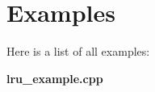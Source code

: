 \section{Examples}
Here is a list of all examples:\begin{DoxyCompactItemize}
\item 
{\bf lru\_\-example.cpp}
\end{DoxyCompactItemize}
